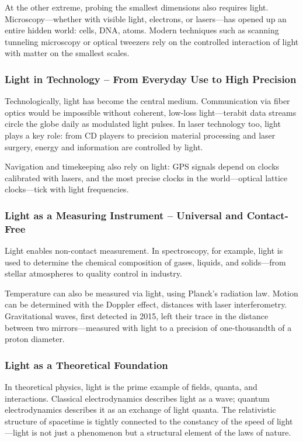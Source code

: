 At the other extreme, probing the smallest dimensions also requires light. Microscopy—whether with visible light, electrons, or lasers—has opened up an entire hidden world: cells, DNA, atoms. Modern techniques such as scanning tunneling microscopy or optical tweezers rely on the controlled interaction of light with matter on the smallest scales.

\subsubsection*{Light in Technology – From Everyday Use to High Precision}
Technologically, light has become the central medium. Communication via fiber optics would be impossible without coherent, low-loss light—terabit data streams circle the globe daily as modulated light pulses. In laser technology too, light plays a key role: from CD players to precision material processing and laser surgery, energy and information are controlled by light.

Navigation and timekeeping also rely on light: GPS signals depend on clocks calibrated with lasers, and the most precise clocks in the world—optical lattice clocks—tick with light frequencies.

\subsubsection*{Light as a Measuring Instrument – Universal and Contact-Free}
Light enables non-contact measurement. In spectroscopy, for example, light is used to determine the chemical composition of gases, liquids, and solids—from stellar atmospheres to quality control in industry.

Temperature can also be measured via light, using Planck’s radiation law. Motion can be determined with the Doppler effect, distances with laser interferometry. Gravitational waves, first detected in 2015, left their trace in the distance between two mirrors—measured with light to a precision of one-thousandth of a proton diameter.

\subsubsection*{Light as a Theoretical Foundation}
In theoretical physics, light is the prime example of fields, quanta, and interactions. Classical electrodynamics describes light as a wave; quantum electrodynamics describes it as an exchange of light quanta. The relativistic structure of spacetime is tightly connected to the constancy of the speed of light—light is not just a phenomenon but a structural element of the laws of nature.

